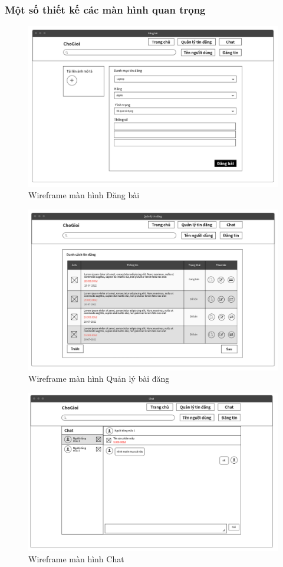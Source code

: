 \documentclass[../DoAn.tex]{subfiles}
\begin{document}
\subsubsection{Một số thiết kế các màn hình quan trọng}
\begin{figure}[H]
    \centering
    \includegraphics[width=0.8\linewidth]{Hinhve/AddPost.png}
    \caption{Wireframe màn hình Đăng bài}
    \label{fig:Fig1}
\end{figure}
\begin{figure}[H]
    \centering
    \includegraphics[width=0.8\linewidth]{Hinhve/PostManageMockup.png}
    \caption{Wireframe màn hình Quản lý bài đăng}
    \label{fig:Fig1}
\end{figure}
\newpage
\begin{figure}[H]
    \centering
    \includegraphics[width=0.8\linewidth]{Hinhve/chatMockup.png}
    \caption{Wireframe màn hình Chat}
    \label{fig:Fig1}
\end{figure}
\end{document}
